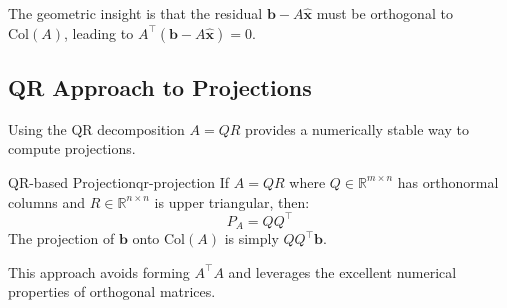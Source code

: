 The geometric insight is that the residual $\mathbf{b} - A\hat{\mathbf{x}}$ must be orthogonal to $\text{Col}(A)$, leading to $A^{\top}(\mathbf{b} - A\hat{\mathbf{x}}) = 0$.


\subsection{QR Approach to Projections}

Using the QR decomposition $A = QR$ provides a numerically stable way to compute projections.

\begin{theorem}{QR-based Projection}{qr-projection}
    If $A = QR$ where $Q  \in  \mathbb{R}^{m \times n}$ has orthonormal columns and $R  \in  \mathbb{R}^{n \times n}$ is upper triangular, then:
    \[
        P_A = QQ^{\top}
    \]
    The projection of $\mathbf{b}$ onto $\text{Col}(A)$ is simply $QQ^{\top} \mathbf{b}$.
\end{theorem}

This approach avoids forming $A^{\top} A$ and leverages the excellent numerical properties of orthogonal matrices.
